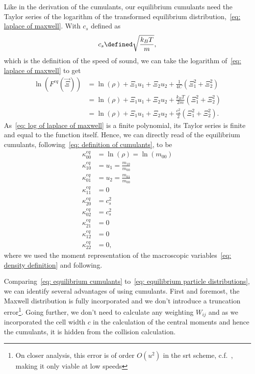 
Like in the derivation of the cumulants, our equilibrium cumulants need the Taylor series of the logarithm of the transformed equilibrium distribution,~\eqref{eq: laplace of maxwell}.
With $c_s$ defined as
\begin{equation}
  c_s \defined \sqrt{\frac{k_B T}{m}},
\end{equation}
which is the definition of the speed of sound, we can take the logarithm of~\eqref{eq: laplace of maxwell} to get
\begin{equation}
  \label{eq: log of laplace of maxwell}
  \begin{aligned}
    \ln(F^{eq}(\vec{\Xi}))
      & = \ln(\rho) + \Xi_1 u_1 + \Xi_2 u_2 + \frac{1}{4C}\left(\Xi_1^2 + \Xi_2^2 \right) \\
      & = \ln(\rho) + \Xi_1 u_1 + \Xi_2 u_2 + \frac{k_B T}{2m}\left(\Xi_1^2 + \Xi_2^2 \right) \\
      & = \ln(\rho) + \Xi_1 u_1 + \Xi_2 u_2 + \frac{c_s^2}{2}\left(\Xi_1^2 + \Xi_2^2 \right).
  \end{aligned}
\end{equation}
As~\eqref{eq: log of laplace of maxwell} is a finite polynomial, its Taylor series is finite and equal to the function itself.
Hence, we can directly read of the equilibrium cumulants, following~\eqref{eq: definition of cumulants}, to be
\begin{equation}
  \label{eq: equilibrium cumulants}
  \begin{aligned}
    \kappa_{00}^{eq} & = \ln(\rho) = \ln(m_{00}) \\
    \kappa_{10}^{eq} & = u_1 = \frac{m_{10}}{m_{00}} \\
    \kappa_{01}^{eq} & = u_2 = \frac{m_{01}}{m_{00}}\\
    \kappa_{11}^{eq} & = 0 \\
    \kappa_{20}^{eq} & = c_s^2  \\
    \kappa_{02}^{eq} & = c_s^2  \\
    \kappa_{21}^{eq} & = 0 \\
    \kappa_{12}^{eq} & = 0 \\
    \kappa_{22}^{eq} & = 0,
  \end{aligned}
\end{equation}
where we used the moment representation of the macroscopic variables~\eqref{eq: density definition} and following.

Comparing~\eqref{eq: equilibrium cumulants} to~\eqref{eq: equilibrium particle distributions}, we can identify several advantages of using cumulants.
First and foremost, the Maxwell distribution is fully incorporated and we don't introduce a truncation error\footnote{On closer analysis, this error is of order $O(u^2)$ in the \gls{srt} scheme, c.f.~\cite[page 178]{wolf2000lattice}, making it only viable at low speeds}.
Going further, we don't need to calculate any weighting $W_{ij}$ and as we incorporated the cell width $c$ in the calculation of the central moments and hence the cumulants, it is hidden from the collision calculation.


